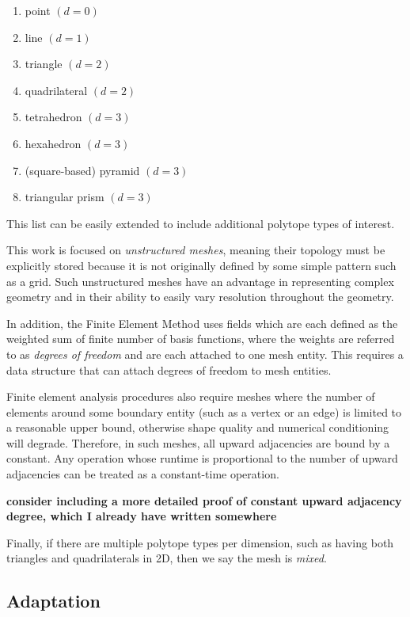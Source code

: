 \begin{enumerate}
\item point $(d = 0)$
\item line $(d = 1)$
\item triangle $(d = 2)$
\item quadrilateral $(d = 2)$
\item tetrahedron $(d = 3)$
\item hexahedron $(d = 3)$
\item (square-based) pyramid $(d = 3)$
\item triangular prism $(d = 3)$
\end{enumerate}

This list can be easily extended to include additional polytope
types of interest.

This work is focused on \emph{unstructured meshes}, meaning
their topology must be explicitly stored because it
is not originally defined by some simple pattern such as a grid.
Such unstructured meshes have an
advantage in representing complex geometry and in their
ability to easily vary resolution throughout the geometry.

In addition, the Finite Element Method uses fields which are each defined
as the weighted sum of finite number of basis functions,
where the weights are referred to as \emph{degrees of freedom} and are each
attached to one mesh entity.
This requires a data structure that can attach
degrees of freedom to mesh entities.

Finite element analysis procedures also require meshes where
the number of elements around some boundary entity (such as a vertex
or an edge) is limited to a reasonable upper bound,
otherwise shape quality and numerical conditioning will degrade.
Therefore, in such meshes, all upward adjacencies are bound
by a constant.
Any operation whose runtime is proportional to the
number of upward adjacencies can be treated as a constant-time operation.

{\bf consider including a more detailed proof of constant upward
adjacency degree, which I already have written somewhere}

Finally, if there are multiple polytope types per dimension,
such as having both triangles and quadrilaterals in 2D, then
we say the mesh is {\it mixed}.

\subsection{Adaptation}
\label{sec:def_adapt}

